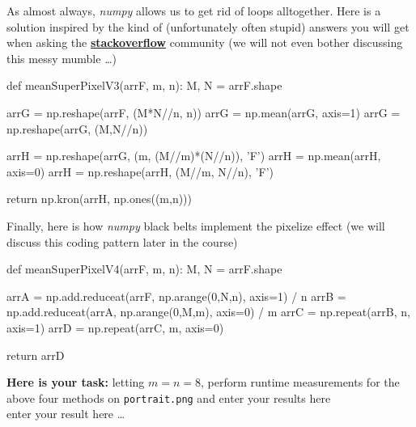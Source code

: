 As almost always, \emph{numpy} allows us to get rid of  loops alltogether. Here is a solution inspired by the kind of (unfortunately often stupid) answers you will get when asking the \href{https://stackoverflow.com/questions/14229029/block-mean-of-numpy-2d-array}{\textbf{stackoverflow}} community (we will not even bother discussing this messy mumble \ldots)

\begin{python}[emph={meanSuperPixelV1,meanSuperPixelV2,meanSuperPixelV3,meanSuperPixelV4}]
def meanSuperPixelV3(arrF, m, n):
    M, N = arrF.shape

    arrG = np.reshape(arrF, (M*N//n, n))
    arrG = np.mean(arrG, axis=1)
    arrG = np.reshape(arrG, (M,N//n))

    arrH = np.reshape(arrG, (m, (M//m)*(N//n)), 'F')
    arrH = np.mean(arrH, axis=0)
    arrH = np.reshape(arrH, (M//m, N//n), 'F')

    return np.kron(arrH, np.ones((m,n)))
\end{python}    

Finally, here is how \emph{numpy} black belts implement the pixelize effect (we will discuss this coding pattern later in the course)
\begin{python}[emph={meanSuperPixelV1,meanSuperPixelV2,meanSuperPixelV3,meanSuperPixelV4}]   
def meanSuperPixelV4(arrF, m, n):
    M, N = arrF.shape

    arrA = np.add.reduceat(arrF, np.arange(0,N,n), axis=1) / n
    arrB = np.add.reduceat(arrA, np.arange(0,M,m), axis=0) / m
    arrC = np.repeat(arrB, n, axis=1)
    arrD = np.repeat(arrC, m, axis=0)
    
    return arrD
\end{python}

\textbf{Here is your task:} letting $m=n=8$,  perform runtime measurements for the above four methods on \texttt{portrait.png} and enter your results here
\color{blue} \\[1ex]
enter your result here \ldots
\color{black}




